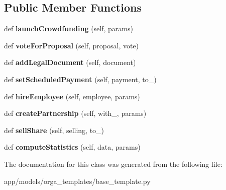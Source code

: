 \subsection*{Public Member Functions}
\begin{DoxyCompactItemize}
\item 
\mbox{\label{classbase__template_1_1_template_specific_orga_ade226097f91fe33e51af3a14c7243b88}} 
def {\bfseries launch\+Crowdfunding} (self, params)
\item 
\mbox{\label{classbase__template_1_1_template_specific_orga_a3b7427cf453f7e29094ac0e40cf8e12b}} 
def {\bfseries vote\+For\+Proposal} (self, proposal, vote)
\item 
\mbox{\label{classbase__template_1_1_template_specific_orga_afe0081b9940905acf371d3873d7682c4}} 
def {\bfseries add\+Legal\+Document} (self, document)
\item 
\mbox{\label{classbase__template_1_1_template_specific_orga_ae6c400597e98ec7df654c602aa28b8c6}} 
def {\bfseries set\+Scheduled\+Payment} (self, payment, to\+\_\+)
\item 
\mbox{\label{classbase__template_1_1_template_specific_orga_a500d06b81087087c2ca9a7187205ea9b}} 
def {\bfseries hire\+Employee} (self, employee, params)
\item 
\mbox{\label{classbase__template_1_1_template_specific_orga_a5af913719dde4d4ce2b6b3929e83563b}} 
def {\bfseries create\+Partnership} (self, with\+\_\+, params)
\item 
\mbox{\label{classbase__template_1_1_template_specific_orga_a8e669289d01303e24ed831b8d9772aaa}} 
def {\bfseries sell\+Share} (self, selling, to\+\_\+)
\item 
\mbox{\label{classbase__template_1_1_template_specific_orga_a55acc34683ec737b0ab04c9203be075c}} 
def {\bfseries compute\+Statistics} (self, data, params)
\end{DoxyCompactItemize}


The documentation for this class was generated from the following file\+:\begin{DoxyCompactItemize}
\item 
app/models/orga\+\_\+templates/base\+\_\+template.\+py\end{DoxyCompactItemize}
